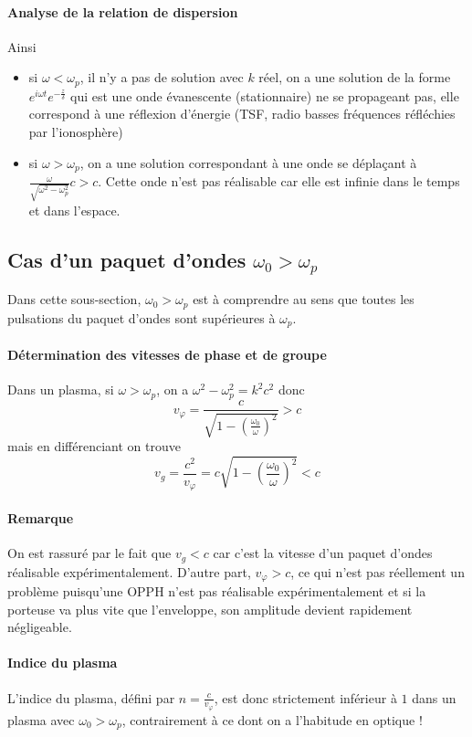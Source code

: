 \documentclass[french]{book}
\theoremstyle{plain}
\theoremstyle{definition}
\theoremstyle{remark}
\begin{document}
\paragraph{Analyse de la relation de dispersion}Ainsi
\begin{itemize}
	\item si $\omega<\omega_p$, il n’y a pas de solution avec $k$ réel, on a une solution de la forme $e^{i\omega t}e^{-\frac{z}{\delta}}$ qui est une onde évanescente (stationnaire) ne se propageant pas, elle correspond à une réflexion d’énergie (TSF, radio basses fréquences réfléchies par l’ionosphère)
	\item si $\omega>\omega_p$, on a une solution correspondant à une onde se déplaçant à $\displaystyle\frac{\omega}{\sqrt{\omega^2-\omega_p^2}}c>c$. Cette onde n'est pas réalisable car elle est infinie dans le temps et dans l'espace.
\end{itemize}
\subsection{Cas d'un paquet d'ondes $\omega_0>\omega_p$}
Dans cette sous-section, $\omega_0>\omega_p$ est à comprendre au sens que toutes les pulsations du paquet d'ondes sont supérieures à $\omega_p$.
\paragraph{Détermination des vitesses de phase et de groupe} Dans un plasma, si $\omega>\omega_p$, on a $\omega^2-\omega_p^2=k^2c^2$ donc $$v_\varphi=\frac{c}{\sqrt{1-\left(\frac{\omega_0}{\omega}\right)^2}}>c$$ mais en différenciant on trouve $$v_g=\frac{c^2}{v_\varphi}=c\sqrt{1-\left(\frac{\omega_0}{\omega}\right)^2}<c$$
\paragraph{Remarque} On est rassuré par le fait que $v_g<c$ car c'est la vitesse d'un paquet d'ondes réalisable expérimentalement. D'autre part, $v_\varphi>c$, ce qui n'est pas réellement un problème puisqu'une OPPH n'est pas réalisable expérimentalement et si la porteuse va plus vite que l'enveloppe, son amplitude devient rapidement négligeable.
\paragraph{Indice du plasma} L'indice du plasma, défini par $n=\displaystyle\frac{c}{v_\varphi}$, est donc strictement inférieur à $1$ dans un plasma avec $\omega_0>\omega_p$, contrairement à ce dont on a l'habitude en optique !
\end{document}
